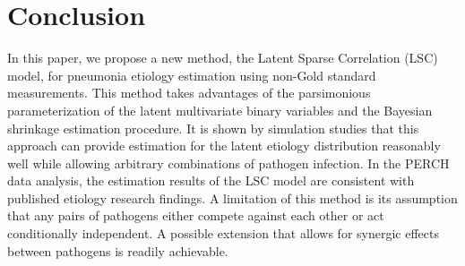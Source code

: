 \documentclass[11 pt, a4paper]{article}  %
\begin{document}
\newpage
\section{Conclusion}
In this paper, we propose a new method, the Latent Sparse Correlation (LSC) model, for pneumonia etiology estimation using non-Gold standard measurements. This method takes advantages of the parsimonious parameterization of the latent multivariate binary variables and the Bayesian shrinkage estimation procedure. It is shown by simulation studies that this approach can provide estimation for the latent etiology distribution reasonably well while allowing arbitrary combinations of pathogen infection. In the PERCH data analysis, the estimation results of the LSC model are consistent with published etiology research findings. A limitation of this method is its assumption that any pairs of pathogens either compete against each other or act conditionally independent. A possible extension that allows for synergic effects between pathogens is readily achievable.  





\newpage
\end{document}
